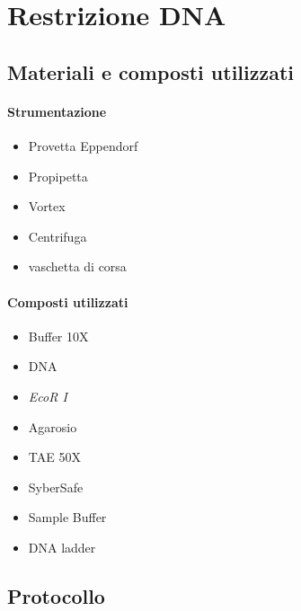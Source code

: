 \section{Restrizione DNA}
\subsection{Materiali e composti utilizzati}
\paragraph{Strumentazione}
\begin{itemize}
	\item Provetta \foreignlanguage{german}{Eppendorf}
	\item Propipetta
	\item \foreignlanguage{english}{Vortex}
	\item Centrifuga
	\item vaschetta di corsa
\end{itemize}

\paragraph{Composti utilizzati}
\begin{itemize}
	\item Buffer 10X
	\item DNA
	\item \emph{EcoR I}
	\item Agarosio
	\item TAE 50X
	\item SyberSafe
	\item \foreignlanguage{english}{Sample Buffer}
	\item \foreignlanguage{english}{DNA ladder}
\end{itemize}




\subsection{Protocollo}
